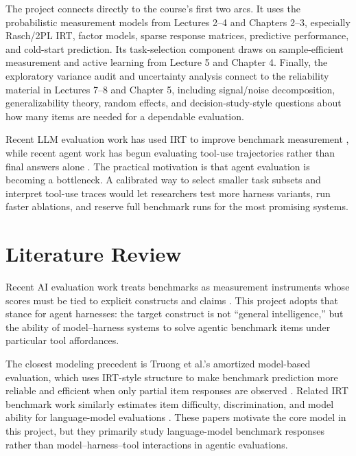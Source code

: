 \documentclass{article}
\begin{document}
The project connects directly to the course's first two arcs. It uses the probabilistic measurement models from Lectures 2--4 and Chapters 2--3, especially Rasch/2PL IRT, factor models, sparse response matrices, predictive performance, and cold-start prediction. Its task-selection component draws on sample-efficient measurement and active learning from Lecture 5 and Chapter 4. Finally, the exploratory variance audit and uncertainty analysis connect to the reliability material in Lectures 7--8 and Chapter 5, including signal/noise decomposition, generalizability theory, random effects, and decision-study-style questions about how many items are needed for a dependable evaluation.

Recent LLM evaluation work has used IRT to improve benchmark measurement \citep{lalor2016evaluation,zhou2025lost}, while recent agent work has begun evaluating tool-use trajectories rather than final answers alone \citep{he2025traject,fan2026agentprocessbench}. The practical motivation is that agent evaluation is becoming a bottleneck. A calibrated way to select smaller task subsets and interpret tool-use traces would let researchers test more harness variants, run faster ablations, and reserve full benchmark runs for the most promising systems.

\section{Literature Review}

Recent AI evaluation work treats benchmarks as measurement instruments whose scores must be tied to explicit constructs and claims \citep{wallach2025socialmeasurement,salaudeen2025measurement,sun2025beyondbenchmarks}. This project adopts that stance for agent harnesses: the target construct is not ``general intelligence,'' but the ability of model--harness systems to solve agentic benchmark items under particular tool affordances.

The closest modeling precedent is Truong et al.'s amortized model-based evaluation, which uses IRT-style structure to make benchmark prediction more reliable and efficient when only partial item responses are observed \citep{truong2025amortized}. Related IRT benchmark work similarly estimates item difficulty, discrimination, and model ability for language-model evaluations \citep{zhou2025lost}. These papers motivate the core model in this project, but they primarily study language-model benchmark responses rather than model--harness--tool interactions in agentic evaluations.
\end{document}
